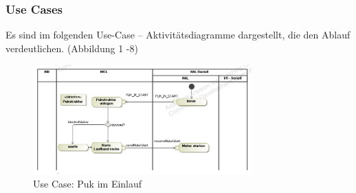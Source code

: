 \documentclass[
   draft=false
  ,paper=a4
  ,twoside=true
  ,fontsize=11pt
  ,headsepline
  ,DIV11
  ,parskip=full+
]{scrartcl} %
\begin{document}
\subsubsection{Use Cases}
Es sind im folgenden Use-Case -- Aktivitätsdiagramme dargestellt, die den Ablauf verdeutlichen. (Abbildung 1 -8)

\begin{figure}[H]
\begin{addmargin*}[0cm]{-0.15\textwidth}
  	\centering
    \includegraphics [width=0.75\textwidth]{./IMG/UseCaseInStart1.png}
    \caption[short Name]{Use Case: Puk im Einlauf}
    	\label{fig:uc1start}
    	\end{addmargin*}
\end{figure}
\end{document}
